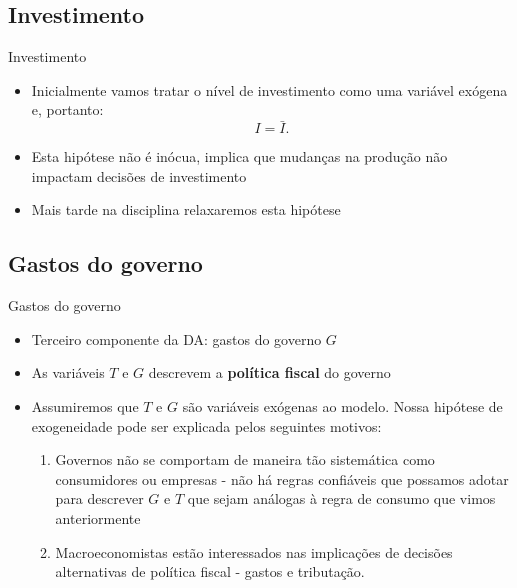 \documentclass[10pt]{beamer}
\begin{document}
\subsection{Investimento}
\begin{frame}{Investimento}
    \begin{itemize}
        \item Inicialmente vamos tratar o nível de investimento como uma variável exógena e, portanto:
        \begin{equation}
            I = \bar{I}.
        \end{equation}
         
        \item Esta hipótese não é inócua, implica que mudanças na produção não impactam decisões de investimento\bigskip
         
        \item Mais tarde na disciplina relaxaremos esta hipótese
    \end{itemize}
\end{frame}

\subsection{Gastos do governo}
\begin{frame}{Gastos do governo}
    \begin{itemize}
        \item Terceiro componente da DA: gastos do governo $G$\bigskip
         
        \item As variáveis $T$ e $G$ descrevem a \textbf{política fiscal} do governo\bigskip
         
        \item Assumiremos que $T$ e $G$ são variáveis exógenas ao modelo. Nossa hipótese de exogeneidade pode ser explicada pelos seguintes motivos:\bigskip
         
        \begin{enumerate}
            \item Governos não se comportam de maneira tão sistemática como consumidores ou empresas - não há regras confiáveis que possamos adotar para descrever $G$ e $T$ que sejam análogas à regra de consumo que vimos anteriormente\medskip
             
            \item Macroeconomistas estão interessados nas implicações de decisões alternativas de política fiscal - gastos e tributação.
        \end{enumerate}
    \end{itemize}
\end{frame}
\end{document}
